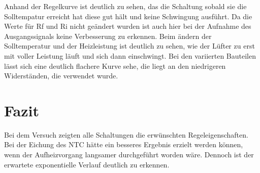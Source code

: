 \documentclass[12pt,a4paper]{article}
\begin{document}
Anhand der Regelkurve ist deutlich zu sehen, das die Schaltung sobald sie die Solltempatur erreicht hat diese gut hält und keine Schwingung ausführt. Da die Werte für Rf und Ri nicht geändert wurden ist auch hier bei der Aufnahme des Ausgangssignals keine Verbesserung zu erkennen. Beim ändern der Solltemperatur und der Heizleistung ist deutlich zu sehen, wie der Lüfter zu erst mit voller Leistung läuft und sich dann einschwingt. Bei den variierten Bauteilen lässt sich eine deutlich flachere Kurve sehe, die liegt an den niedrigeren Widerständen, die verwendet wurde. 

\section{Fazit}

Bei dem Versuch zeigten alle Schaltungen die erwünschten Regeleigenschaften. Bei der Eichung des NTC hätte ein besseres Ergebnis erzielt werden können, wenn der Aufheizvorgang langsamer durchgeführt worden wäre. Dennoch ist der erwartete exponentielle Verlauf deutlich zu erkennen.
\end{document}
